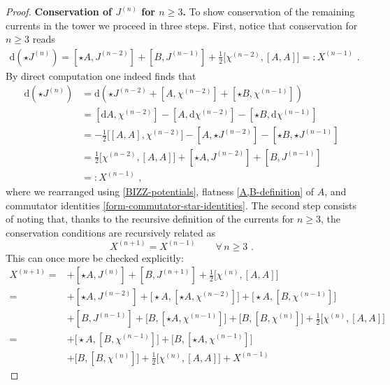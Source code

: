 \documentclass[12pt]{article}
\numberwithin{equation}{section}
\begin{document}
\begin{proof}
\textbf{Conservation of $J^{(n)}$ for $n\geq3$.} \qquad To show conservation of the remaining currents in the tower we proceed in three steps. First, notice that conservation for $n\geq3$ reads
\begin{equation}
\begin{aligned}
\mathrm{d}(\star J^{(n)})= [\star A,J^{(n-2)}]+[B,J^{(n-1)}]+\tfrac{1}{2}\bigl[\chi^{(n-2)},[A,A]\bigr] =: X^{(n-1)} \,\, .
\end{aligned}
\end{equation}
By direct computation one indeed finds that
\begin{equation}
\begin{aligned}
\mathrm{d}(\star J^{(n)})&=\mathrm{d}(\star J^{(n-2)}+[A,\chi^{(n-2)}]+[\star B,\chi^{(n-1)}])
\\
&=[\mathrm{d}A,\chi^{(n-2)}]-[A,\mathrm{d}\chi^{(n-2)}]-[\star B,\mathrm{d}\chi^{(n-1)}]
\\
&=-\tfrac{1}{2}\bigl[ [A,A],\chi^{(n-2)}\bigr]-[A,\star J^{(n-2)}]-[\star B,\star J^{(n-1)}]
\\
&=\tfrac{1}{2}\bigl[\chi^{(n-2)},[A,A]\bigr]+[\star A, J^{(n-2)}]+[B, J^{(n-1)}]
\\
&=: X^{(n-1)} \,\, ,
\end{aligned}
\end{equation}
where we rearranged using \eqref{BIZZ-potentials}, flatness \eqref{A,B-definition} of $A$, and commutator identities \eqref{form-commutator-star-identities}. The second step consists of noting that, thanks to the recursive definition of the currents for $n \geq 3$, the conservation conditions are recursively related as
\begin{equation}
X^{(n+1)}=X^{(n-1)} \qquad \forall \, n\geq 3 \,\, .
\end{equation}
This can once more be checked explicitly:
\begin{equation}
\begin{aligned}
X^{(n+1)}=&+[\star A,J^{(n)}]+[B,J^{(n+1)}]+\tfrac{1}{2}\bigl[\chi^{(n)},[A,A]\bigr] 
\\
=&+[\star A,J^{(n-2)}]+\bigl[\star A,[\star A,\chi^{(n-2)}] \bigr]+\bigl[\star A,[B,\chi^{(n-1)}]  \bigr]
\\
&+[B,J^{(n-1)}]+\bigl[B,[\star A,\chi^{(n-1)}] \bigr]+\bigl[B,[B,\chi^{(n)}] \bigr]+\tfrac{1}{2}\bigl[\chi^{(n)},[A,A]\bigr]
\\
=&+\bigl[\star A,[B,\chi^{(n-1)}]  \bigr]+\bigl[B,[\star A,\chi^{(n-1)}] \bigr]
\\
&+\bigl[B,[B,\chi^{(n)}] \bigr]+\tfrac{1}{2}\bigl[\chi^{(n)},[A,A]\bigr]+X^{(n-1)}

\end{aligned}
\end{equation}
\end{proof}
\end{document}
